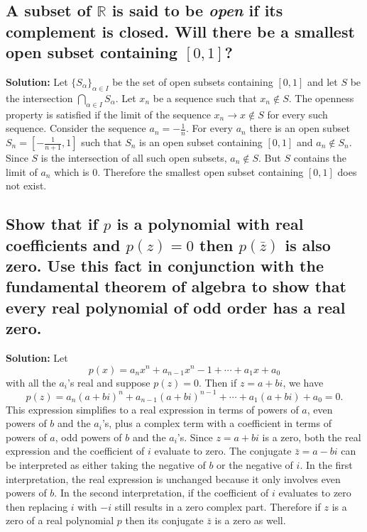 \documentclass{article}
\newcommand{\exercise}[1]{\subsection{\normalfont #1}}
\newcommand{\solution}{\indent\indent \textbf{Solution: }}
\begin{document}
\exercise{A subset of $\mathbb{R}$ is said to be \textit{open} if its complement is closed. Will there be a smallest open subset containing $[0,1]$?}
\solution 
Let $\{S_\alpha\}_{\alpha \in I}$ be the set of open subsets containing $[0,1]$ and let $S$ be the intersection $\bigcap_{\alpha \in I} S_\alpha$. Let $x_n$ be a sequence such that $x_n \notin S$. The openness property is satisfied if the limit of the sequence $x_n \to x \notin S$ for every such sequence. Consider the sequence $a_n = -\frac{1}{n}$. For every $a_n$ there is an open subset $S_n = [-\frac{1}{n+1}, 1]$ such that $S_n$ is an open subset containing $[0,1]$ and $a_n \notin S_n$. Since $S$ is the intersection of all such open subsets, $a_n \notin S$. But $S$ contains the limit of $a_n$ which is 0. Therefore the smallest open subset containing $[0,1]$ does not exist. 

\exercise{Show that if $p$ is a polynomial with real coefficients and $p(z) = 0$ then $p(\bar{z})$ is also zero. Use this fact in conjunction with the fundamental theorem of algebra to show that every real polynomial of odd order has a real zero.}
\solution Let $$p(x) = a_nx^n + a_{n-1}x^n-1 + \dotsb + a_1x + a_0$$ with all the $a_i$'s real and suppose $p(z) = 0$. Then if $z=a+bi$,  we have $$p(z) = a_n(a+bi)^n + a_{n-1}(a+bi)^{n-1} + \dotsb + a_1(a + bi) + a_0= 0.$$ This expression simplifies to a real expression in terms of powers of $a$, even powers of $b$ and the $a_i$'s, plus a complex term with a coefficient in terms of powers of $a$, odd powers of $b$ and the $a_i$'s. Since $z=a+bi$ is a zero, both the real expression and the coefficient of $i$ evaluate to zero. The conjugate $\bar z =a-bi$ can be interpreted as either taking the negative of $b$ or the negative of $i$. In the first interpretation, the real expression is unchanged because it only involves even powers of $b$. In the second interpretation, if the coefficient of $i$ evaluates to zero then replacing $i$ with $-i$ still results in a zero complex part. Therefore if $z$ is a zero of a real polynomial $p$ then its conjugate $\bar z$ is a zero as well. 

\newpage
\end{document}
